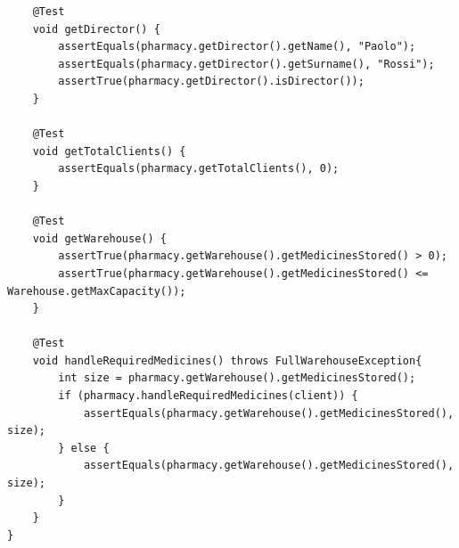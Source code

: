 \documentclass[a4paper, 10pt]{report}
\begin{document}
\begin{lstlisting}
    @Test
    void getDirector() {
        assertEquals(pharmacy.getDirector().getName(), "Paolo");
        assertEquals(pharmacy.getDirector().getSurname(), "Rossi");
        assertTrue(pharmacy.getDirector().isDirector());
    }

    @Test
    void getTotalClients() {
        assertEquals(pharmacy.getTotalClients(), 0);
    }

    @Test
    void getWarehouse() {
        assertTrue(pharmacy.getWarehouse().getMedicinesStored() > 0);
        assertTrue(pharmacy.getWarehouse().getMedicinesStored() <= Warehouse.getMaxCapacity());
    }

    @Test
    void handleRequiredMedicines() throws FullWarehouseException{
        int size = pharmacy.getWarehouse().getMedicinesStored();
        if (pharmacy.handleRequiredMedicines(client)) {
            assertEquals(pharmacy.getWarehouse().getMedicinesStored(), size);
        } else {
            assertEquals(pharmacy.getWarehouse().getMedicinesStored(), size);
        }
    }
}
\end{lstlisting}
\end{document}
